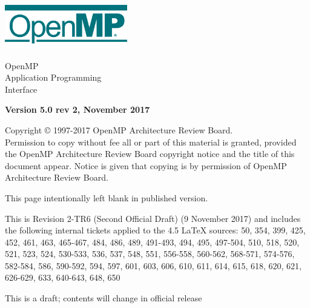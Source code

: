 
  \begin{titlepage}
    \begin{flushleft}
     \hspace{-6em} \includegraphics[width=0.4\textwidth]{openmp-logo.png}
    \end{flushleft}

    \begin{adjustwidth}{-0.75in}{0in}
    \begin{center}
      \Huge
      \textsf{OpenMP\\Application Programming\\Interface}

      \vspace{0.5in}\textsf{    }\vspace{-0.7in}
      \normalsize

      \vspace{1.0in}

      \textbf{Version 5.0 rev 2, November 2017}
    \end{center}
    \end{adjustwidth}

    \vspace{3.0in}

\begin{adjustwidth}{0pt}{1em}\setlength{\parskip}{0.25\baselineskip}%
Copyright © 1997-2017 OpenMP Architecture Review Board.\\
Permission to copy without fee all or part of this material is granted,
provided the OpenMP Architecture Review Board copyright notice and
the title of this document appear. Notice is given that copying is by
permission of OpenMP Architecture Review Board.\end{adjustwidth}

  \end{titlepage}


\clearpage
\thispagestyle{empty}
\phantom{a}
This page intentionally left blank in published version.

This is Revision 2-TR6 (Second Official Draft) (9 November 2017) and 
includes the following internal tickets applied to the 4.5 LaTeX sources: 
50, 354, 399, 425, 452, 461, 463, 465-467, 484, 486, 489, 491-493, 494, 
495, 497-504, 510, 518, 520, 521, 523, 524, 530-533, 536, 537, 548, 551, 
556-558, 560-562, 568-571, 574-576, 582-584, 586, 590-592, 594, 597, 601, 
603, 606, 610, 611, 614, 615, 618, 620, 621, 626-629, 633, 640-643, 648, 
650

This is a draft; contents will change in official release

\vfill

